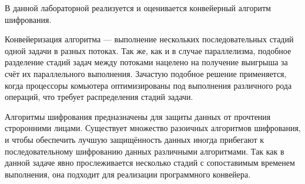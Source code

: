 В данной лабораторной реализуется и оценивается конвейерный алгоритм шифрования.

Конвейеризация алгоритма --- выполнение нескольких последовательных стадий одной задачи в разных потоках. Так же, как и в случае параллелизма, подобное разделение стадий задач между потоками нацелено на получение выигрыша за счёт их параллельного выполнения. Зачастую подобное решение применяется, когда процессоры комьютера оптимизированы под выполнения различного рода операций, что требует распределения стадий задачи.

Алгоритмы шифрования предназначены для защиты данных от прочтения строронними лицами. Существует множество разоичных алгоритмов шифрования, и чтобы обеспечить лучшую защищённость данных иногда прибегают к последовательному шифрованию данных различными алгоритмами. Так как в данной задаче явно прослеживается несколько стадий с сопоставимым временем выполнения, она подходит для реализации программного конвейера.